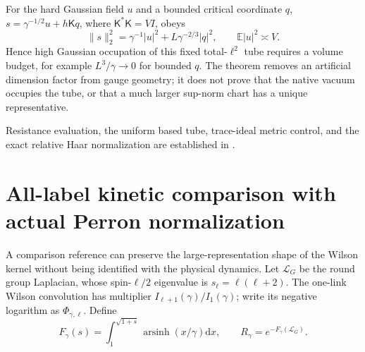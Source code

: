 \documentclass[11pt,oneside,openany]{book}
\theoremstyle{definition}
\theoremstyle{remark}
\newcommand{\E}{\mathbb E}
\newcommand{\dd}{\mathrm d}
\newcommand{\src}[2]{\cite[#2]{#1}}
\newcommand{\sourcebasis}[1]{\par\smallskip\noindent #1\par}
\begin{document}
For the hard Gaussian field $u$ and a bounded critical coordinate $q$,
$s=\gamma^{-1/2}u+h\mathsf Kq$, where $\mathsf K^*\mathsf K=VI$,
obeys
\begin{equation}
 \|s\|_2^2=\gamma^{-1}|u|^2+L\gamma^{-2/3}|q|^2,
 \qquad \E|u|^2\asymp V.
 \label{eq:native-tube-occupation}
\end{equation}
Hence high Gaussian occupation of this fixed total-$\ell^2$ tube
requires a volume budget, for example $L^3/\gamma\to0$ for bounded
$q$. The theorem removes an artificial dimension factor from gauge
geometry; it does not prove that the native vacuum occupies the tube,
or that a much larger sup-norm chart has a unique representative.
\sourcebasis{Resistance evaluation, the uniform based tube, trace-ideal
metric control, and the exact relative Haar normalization are established
in \src{F16B}{V50}.}


\section{All-label kinetic comparison with actual Perron normalization}
\label{sec:native-subordination}
A comparison reference can preserve the large-representation shape of the
Wilson kernel without being identified with the physical dynamics. Let
$\mathcal L_G$ be the round group Laplacian, whose spin-$\ell/2$
eigenvalue is $s_\ell=\ell(\ell+2)$. The one-link Wilson convolution has
multiplier $I_{\ell+1}(\gamma)/I_1(\gamma)$; write its negative logarithm
as $\Phi_{\gamma,\ell}$. Define
\begin{equation}
 F_\gamma(s)=\int_1^{\sqrt{1+s}}\operatorname{arsinh}(x/\gamma)\dd x,
 \qquad R_\gamma=e^{-F_\gamma(\mathcal L_G)}.
 \label{eq:native-Bernstein-dispersion}
\end{equation}
\end{document}

